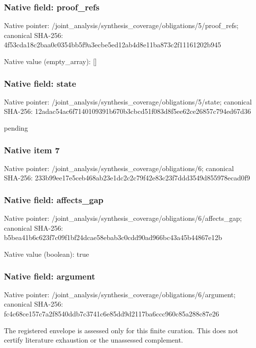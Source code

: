 \documentclass[10pt,a4paper]{article}
\begin{document}
\subsubsection{Native field: proof\_\allowbreak{}refs}
Native pointer: /joint\_\allowbreak{}analysis/synthesis\_\allowbreak{}coverage/obligations/5/proof\_\allowbreak{}refs; canonical SHA-256: 4f53cda18c2baa0c0354bb5f9a3ecbe5ed12ab4d8e11ba873c2f11161202b945

Native value (empty\_\allowbreak{}array): []

\subsubsection{Native field: state}
Native pointer: /joint\_\allowbreak{}analysis/synthesis\_\allowbreak{}coverage/obligations/5/state; canonical SHA-256: 12adac54ac6f7140109391b670b3cbcd51f083d8f5ee62ce26857c794ed67d36

\begingroup\raggedright\sloppy pending\par\endgroup

\subsubsection{Native item 7}
Native pointer: /joint\_\allowbreak{}analysis/synthesis\_\allowbreak{}coverage/obligations/6; canonical SHA-256: 233b99ee17e5ceb468ab23e1dc2c2c79f42e83c23f7ddd3549d855978ecad0f9

\subsubsection{Native field: affects\_\allowbreak{}gap}
Native pointer: /joint\_\allowbreak{}analysis/synthesis\_\allowbreak{}coverage/obligations/6/affects\_\allowbreak{}gap; canonical SHA-256: b5bea41b6c623f7c09f1bf24dcae58ebab3c0cdd90ad966bc43a45b44867e12b

Native value (boolean): true

\subsubsection{Native field: argument}
Native pointer: /joint\_\allowbreak{}analysis/synthesis\_\allowbreak{}coverage/obligations/6/argument; canonical SHA-256: fc4c68ce157c7a2f8540ddb7c3741c6e85dd9d2117ba6ccc960c85a288c87e26

\begingroup\raggedright\sloppy The registered envelope is assessed only for this finite curation. This does not certify literature exhaustion or the unassessed complement.\par\endgroup
\end{document}
